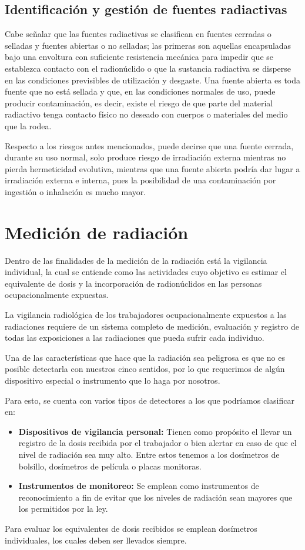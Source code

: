 \section*{Identificación y gestión de fuentes radiactivas}

Cabe señalar que las fuentes radiactivas se clasifican en fuentes cerradas o selladas y fuentes abiertas o no selladas; las primeras son aquellas encapsuladas bajo una envoltura con suficiente resistencia mecánica para impedir que se establezca contacto con el radionúclido o que la sustancia radiactiva se disperse en las condiciones previsibles de utilización y desgaste. Una fuente abierta es toda fuente que no está sellada y que, en las condiciones normales de uso, puede producir contaminación, es decir, existe el riesgo de que parte del material radiactivo tenga contacto físico no deseado con cuerpos o materiales del medio que la rodea.

Respecto a los riesgos antes mencionados, puede decirse que una fuente cerrada, durante su uso normal, solo produce riesgo de irradiación externa mientras no pierda hermeticidad evolutiva, mientras que una fuente abierta podría dar lugar a irradiación externa e interna, pues la posibilidad de una contaminación por ingestión o inhalación es mucho mayor.

\chapter{Medición de radiación}

Dentro de las finalidades de la medición de la radiación está la vigilancia individual, la cual se entiende como las actividades cuyo objetivo es estimar el equivalente de dosis y la incorporación de radionúclidos en las personas ocupacionalmente expuestas.

La vigilancia radiológica de los trabajadores ocupacionalmente expuestos a las radiaciones requiere de un sistema completo de medición, evaluación y registro de todas las exposiciones a las radiaciones que pueda sufrir cada individuo.

Una de las características que hace que la radiación sea peligrosa es que no es posible detectarla con nuestros cinco sentidos, por lo que requerimos de algún dispositivo especial o instrumento que lo haga por nosotros.

Para esto, se cuenta con varios tipos de detectores a los que podríamos clasificar en:

\begin{itemize}
    \item \textbf{Dispositivos de vigilancia personal:} Tienen como propósito el llevar un registro de la dosis recibida por el trabajador o bien alertar en caso de que el nivel de radiación sea muy alto. Entre estos tenemos a los dosímetros de bolsillo, dosímetros de película o placas monitoras.
    \item \textbf{Instrumentos de monitoreo:} Se emplean como instrumentos de reconocimiento a fin de evitar que los niveles de radiación sean mayores que los permitidos por la ley.
\end{itemize}

Para evaluar los equivalentes de dosis recibidos se emplean dosímetros individuales, los cuales deben ser llevados siempre.
